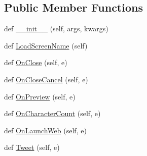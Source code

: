 \subsection*{Public Member Functions}
\begin{DoxyCompactItemize}
\item 
def \hyperlink{class_uni_dec_1_1unidec__modules_1_1isolated__packages_1_1twitter__interface_1_1_twitter_window_a7dd85b8512589817ed598b529c9bffe1}{\+\_\+\+\_\+init\+\_\+\+\_\+} (self, args, kwargs)
\item 
def \hyperlink{class_uni_dec_1_1unidec__modules_1_1isolated__packages_1_1twitter__interface_1_1_twitter_window_aec1b8854110d03b9b86818349956b91b}{Load\+Screen\+Name} (self)
\item 
def \hyperlink{class_uni_dec_1_1unidec__modules_1_1isolated__packages_1_1twitter__interface_1_1_twitter_window_ad4e445494ee55ef0c305b8c05461eec9}{On\+Close} (self, e)
\item 
def \hyperlink{class_uni_dec_1_1unidec__modules_1_1isolated__packages_1_1twitter__interface_1_1_twitter_window_ae9b04f46eb286a59920eec0375c87ca1}{On\+Close\+Cancel} (self, e)
\item 
def \hyperlink{class_uni_dec_1_1unidec__modules_1_1isolated__packages_1_1twitter__interface_1_1_twitter_window_a3abefd434e17ed919c6c06074df373a1}{On\+Preview} (self, e)
\item 
def \hyperlink{class_uni_dec_1_1unidec__modules_1_1isolated__packages_1_1twitter__interface_1_1_twitter_window_aeea5fc874c1022f2af9f094c951fe0e5}{On\+Character\+Count} (self, e)
\item 
def \hyperlink{class_uni_dec_1_1unidec__modules_1_1isolated__packages_1_1twitter__interface_1_1_twitter_window_a899f6b71431814ddb5bb1a6f90762aeb}{On\+Launch\+Web} (self, e)
\item 
def \hyperlink{class_uni_dec_1_1unidec__modules_1_1isolated__packages_1_1twitter__interface_1_1_twitter_window_a93dd81749a05ffff550dcb1134f868c1}{Tweet} (self, e)
\end{DoxyCompactItemize}
